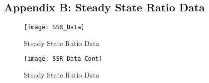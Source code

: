 \subsection{Appendix B: Steady State Ratio Data}

\begin{figure}[H]
	\center 
	\texttt{[image: SSR\_Data]}
	\caption[Steady State Ratio Data]{Steady State Ratio Data}
\end{figure}

\newpage  %

\begin{figure}[H]
	\center 
	\texttt{[image: SSR\_Data\_Cont]}
	\caption[Steady State Ratio Data]{Steady State Ratio Data}
\end{figure}

\newpage  %